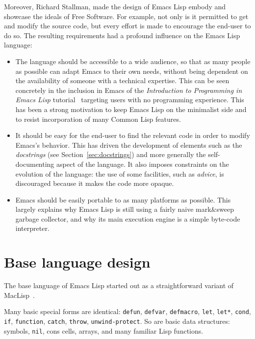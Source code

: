 \documentclass[format=acmsmall, review]{acmart}
\newcommand \Elisp {Emacs Lisp}
\begin{document}
Moreover, Richard Stallman, made the design of \Elisp{}
embody and showcase the ideals of Free Software.  For example, not only
is it permitted to get and modify the source code, but every effort
is made to encourage the end-user to do so.  The resulting requirements had a profound
influence on the \Elisp{} language:
\begin{itemize}
\item The language should be accessible to a wide audience, so that as many
  people as possible can adapt Emacs to their own needs, without being
  dependent on the availability of someone with a technical expertise.
  This can be seen concretely in the inclusion in Emacs of the
  \emph{Introduction to Programming in Emacs Lisp}
  tutorial~\citep{ElispIntro} targeting users with no programming
  experience.  This has been a strong motivation to keep \Elisp{} on the
  minimalist side and to resist incorporation of many Common Lisp features.
\item It should be easy for the end-user to find the relevant code in order
  to modify Emacs's behavior.  This has driven the development of elements
  such as the \emph{docstrings} (see Section~\ref{sec:docstrings}) and more generally the self-documenting
  aspect of the language.  It also imposes constraints on the evolution of
  the language: the use of some facilities, such as \emph{advice}, is
  discouraged because it makes the code more opaque.
\item Emacs should be easily portable to as many platforms as possible.
  This largely explains why \Elisp{} is still using a fairly naive
  mark\&sweep garbage collector, and why its main execution engine is
  a simple byte-code interpreter.
\end{itemize}

\section{Base language design}
\label{sec:base-language-design}

The base language of \Elisp{} started out as a straightforward
variant of MacLisp~\cite{Moon1974,Pitman1983}.

Many basic special forms are identical: \texttt{defun},
\texttt{defvar}, \texttt{defmacro}, \texttt{let}, \texttt{let*},
\texttt{cond}, \texttt{if}, \texttt{function}, \texttt{catch}, \texttt{throw},
\texttt{unwind-protect}.  So are basic data structures: symbols,
\texttt{nil}, cons cells, arrays, and many familiar Lisp
functions.
\end{document}
